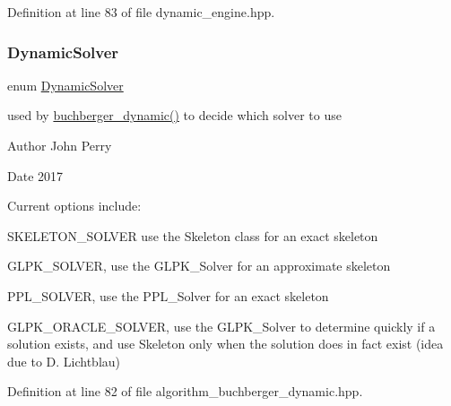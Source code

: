 Definition at line 83 of file dynamic\+\_\+engine.\+hpp.

\mbox{\label{group___g_b_computation_ga28fbbb9eb7d8b80ced05c8fa89b2bdac}} 
\subsubsection{\texorpdfstring{Dynamic\+Solver}{DynamicSolver}}
{\footnotesize\ttfamily enum \hyperlink{group___g_b_computation_ga28fbbb9eb7d8b80ced05c8fa89b2bdac}{Dynamic\+Solver}}



used by \hyperlink{group___g_b_computation_ga2c05f4e2ea8b43bb696483469f4cce83}{buchberger\+\_\+dynamic()} to decide which solver to use 

\begin{DoxyAuthor}{Author}
John Perry 
\end{DoxyAuthor}
\begin{DoxyDate}{Date}
2017
\end{DoxyDate}
Current options include\+:
\begin{DoxyItemize}
\item S\+K\+E\+L\+E\+T\+O\+N\+\_\+\+S\+O\+L\+V\+ER use the Skeleton class for an exact skeleton
\item G\+L\+P\+K\+\_\+\+S\+O\+L\+V\+ER, use the G\+L\+P\+K\+\_\+\+Solver for an approximate skeleton
\item P\+P\+L\+\_\+\+S\+O\+L\+V\+ER, use the P\+P\+L\+\_\+\+Solver for an exact skeleton
\item G\+L\+P\+K\+\_\+\+O\+R\+A\+C\+L\+E\+\_\+\+S\+O\+L\+V\+ER, use the G\+L\+P\+K\+\_\+\+Solver to determine quickly if a solution exists, and use Skeleton only when the solution does in fact exist (idea due to D. Lichtblau) 
\end{DoxyItemize}

Definition at line 82 of file algorithm\+\_\+buchberger\+\_\+dynamic.\+hpp.

\mbox{\label{group___g_b_computation_ga73257b8a2d5cc826853a71b77d0cebf2}} 
